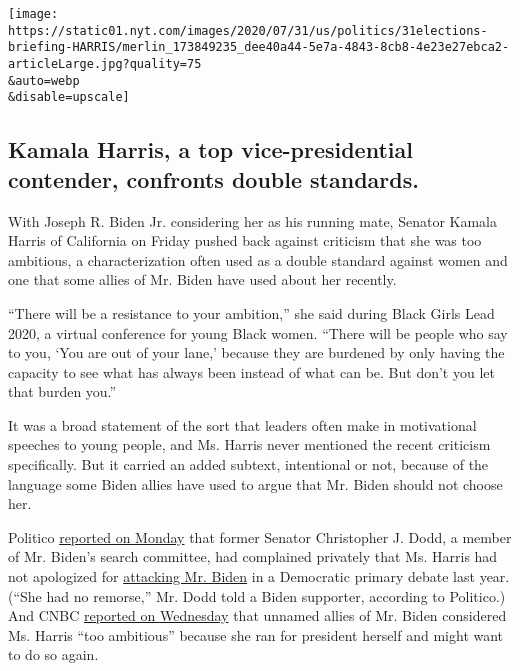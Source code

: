 \texttt{[image: https://static01.nyt.com/images/2020/07/31/us/politics/31elections-briefing-HARRIS/merlin\_173849235\_dee40a44-5e7a-4843-8cb8-4e23e27ebca2-articleLarge.jpg?quality=75\\\&auto=webp\\\&disable=upscale]}

\hypertarget{kamala-harris-a-top-vice-presidential-contender-confronts-double-standards}{%
\subsection{Kamala Harris, a top vice-presidential contender, confronts
double
standards.}\label{kamala-harris-a-top-vice-presidential-contender-confronts-double-standards}}

With Joseph R. Biden Jr. considering her as his running mate, Senator
Kamala Harris of California on Friday pushed back against criticism that
she was too ambitious, a characterization often used as a double
standard against women and one that some allies of Mr. Biden have used
about her recently.

``There will be a resistance to your ambition,'' she said during Black
Girls Lead 2020, a virtual conference for young Black women. ``There
will be people who say to you, `You are out of your lane,' because they
are burdened by only having the capacity to see what has always been
instead of what can be. But don't you let that burden you.''

It was a broad statement of the sort that leaders often make in
motivational speeches to young people, and Ms. Harris never mentioned
the recent criticism specifically. But it carried an added subtext,
intentional or not, because of the language some Biden allies have used
to argue that Mr. Biden should not choose her.

Politico
\href{https://www.politico.com/news/2020/07/27/kamala-harris-biden-vp-381829}{reported
on Monday} that former Senator Christopher J. Dodd, a member of Mr.
Biden's search committee, had complained privately that Ms. Harris had
not apologized for
\href{https://www.nytimes.com/2019/06/27/us/politics/kamala-harris-busing-joe-biden.html}{attacking
Mr. Biden} in a Democratic primary debate last year. (``She had no
remorse,'' Mr. Dodd told a Biden supporter, according to Politico.) And
CNBC
\href{https://www.cnbc.com/2020/07/29/biden-allies-move-to-stop-kamala-harris-from-becoming-vice-president.html}{reported
on Wednesday} that unnamed allies of Mr. Biden considered Ms. Harris
``too ambitious'' because she ran for president herself and might want
to do so again.

